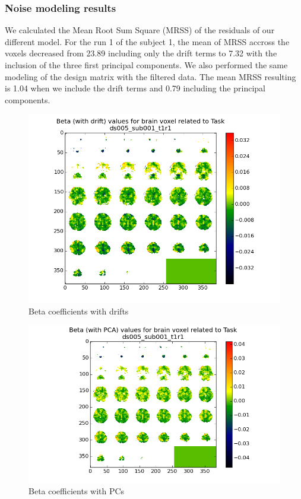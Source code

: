 \subsubsection{Noise modeling results}
\noindent
\par We calculated the Mean Root Sum Square (MRSS) of the residuals of our different model.
For the run 1 of the subject 1, the mean of MRSS accross the voxels decreased from 23.89 
including only the drift terms to 7.32 with the inclusion of the three first principal 
components. We also performed the same modeling of the design matrix with the filtered data.
The mean MRSS resulting is 1.04 when we include the drift terms and 0.79 including the 
principal components.

\begin{figure}[H]
  \centering
  \includegraphics[scale=0.75]{../fig/mosaic/ds005_sub001_t1r1_withdrift_Task.png}
  \caption{Beta coefficients with drifts}
  \label{fig:betas1}
\end{figure}

\begin{figure}[H]
  \centering
  \includegraphics[scale=0.85]{../fig/mosaic/ds005_sub001_t1r1_withPCA_Task.png}
  \caption{Beta coefficients with PCs}
  \label{fig:betas2}
\end{figure}

